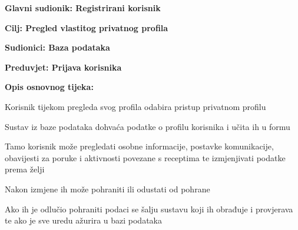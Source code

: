 				\noindent {}
				\begin{packed_item}
					
					\item \textbf{Glavni sudionik: Registrirani korisnik}
					\item  \textbf{Cilj: Pregled vlastitog privatnog profila} 
					\item  \textbf{Sudionici: Baza podataka} 
					\item  \textbf{Preduvjet: Prijava korisnika} 
					\item  \textbf{Opis osnovnog tijeka:}
					
					\item[] \begin{packed_enum}
						
						\item Korisnik tijekom pregleda svog profila odabira pristup privatnom profilu
						\item Sustav iz baze podataka dohvaća podatke o profilu korisnika i učita ih u formu 
						\item Tamo korisnik može pregledati osobne informacije, postavke komunikacije, obavijesti za poruke i aktivnosti povezane s receptima te izmjenjivati podatke prema želji 
						\item Nakon izmjene ih može pohraniti ili odustati od pohrane
						\item Ako ih je odlučio pohraniti podaci se šalju sustavu koji ih obrađuje i provjerava te ako je sve uredu ažurira u bazi podataka
						
					\end{packed_enum}
					
				\end{packed_item}
				
